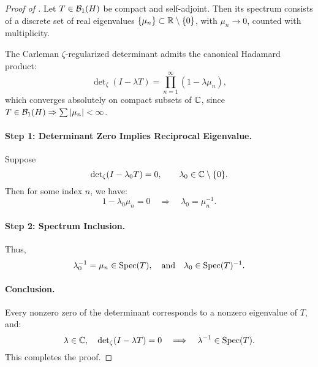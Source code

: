 \begin{proof}[Proof of ]
Let \( T \in \mathcal{B}_1(H) \) be compact and self-adjoint. Then its spectrum consists of a discrete set of real eigenvalues \( \{ \mu_n \} \subset \mathbb{R} \setminus \{0\} \), with \( \mu_n \to 0 \), counted with multiplicity.

The Carleman \(\zeta\)-regularized determinant admits the canonical Hadamard product:
\[
\det\nolimits_\zeta(I - \lambda T) = \prod_{n=1}^\infty (1 - \lambda \mu_n),
\]
which converges absolutely on compact subsets of \( \mathbb{C} \), since \( T \in \mathcal{B}_1(H) \Rightarrow \sum |\mu_n| < \infty \).

\paragraph{Step 1: Determinant Zero Implies Reciprocal Eigenvalue.}
Suppose
\[
\det\nolimits_\zeta(I - \lambda_0 T) = 0, \qquad \lambda_0 \in \mathbb{C} \setminus \{0\}.
\]
Then for some index \( n \), we have:
\[
1 - \lambda_0 \mu_n = 0 \quad \Longrightarrow \quad \lambda_0 = \mu_n^{-1}.
\]

\paragraph{Step 2: Spectrum Inclusion.}
Thus,
\[
\lambda_0^{-1} = \mu_n \in \operatorname{Spec}(T),
\quad \text{and} \quad \lambda_0 \in \operatorname{Spec}(T)^{-1}.
\]

\paragraph{Conclusion.}
Every nonzero zero of the determinant corresponds to a nonzero eigenvalue of \( T \), and:
\[
\lambda \in \mathbb{C}, \quad \det\nolimits_\zeta(I - \lambda T) = 0
\quad \Longrightarrow \quad
\lambda^{-1} \in \operatorname{Spec}(T).
\]
This completes the proof.
\end{proof}

